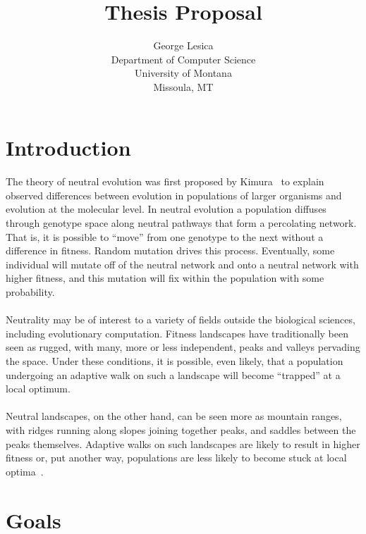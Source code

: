 \documentclass[12pt,letterpaper,titlepage,draft]{article}
\title{Thesis Proposal}
\author{George Lesica\\
Department of Computer Science\\
University of Montana\\
Missoula, MT}
\begin{document}
\maketitle

\section*{Introduction}

\paragraph{}
The theory of neutral evolution was first proposed by Kimura~\cite{Kimura1984}
to explain observed differences between evolution in populations of larger
organisms and evolution at the molecular level. In neutral evolution a
population diffuses through genotype space along neutral pathways that form a
percolating network. That is, it is possible to ``move'' from one genotype to
the next without a difference in fitness. Random mutation drives this process.
Eventually, some individual will mutate off of the neutral network and onto a
neutral network with higher fitness, and this mutation will fix within the
population with some probability.

\paragraph{}
Neutrality may be of interest to a variety of fields outside the biological
sciences, including evolutionary computation. Fitness landscapes have
traditionally been seen as rugged, with many, more or less independent, peaks
and valleys pervading the space. Under these conditions, it is possible, even
likely, that a population undergoing an adaptive walk on such a landscape will
become ``trapped'' at a local optimum.

\paragraph{}
Neutral landscapes, on the other hand, can be seen more as mountain ranges,
with ridges running along slopes joining together peaks, and saddles between
the peaks themselves. Adaptive walks on such landscapes are likely to result in
higher fitness or, put another way, populations are less likely to become stuck
at local optima~\cite{Newman1998}.

\section*{Goals}
\end{document}
